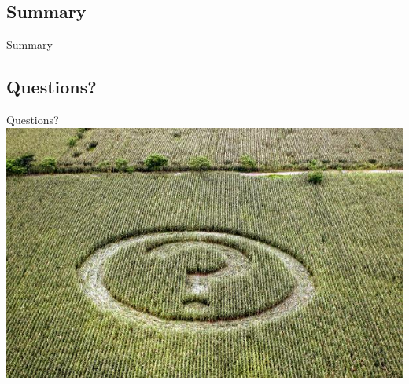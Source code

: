 \documentclass[screen, compress]{beamer}
\begin{document}
\subsection{Summary}
\begin{frame}{Summary} %

\end{frame}

\subsection{Questions?}
\begin{frame}{Questions?}
\includegraphics[width=\textwidth]{img/any-questions}
\end{frame}
\end{document}

